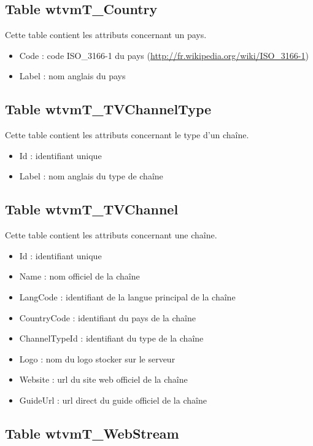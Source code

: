 \documentclass[10pt,a4paper]{article}
\begin{document}
\subsection{Table wtvmT\_Country}

Cette table contient les attributs concernant un pays.

\begin{itemize}
\item Code : code ISO\_3166-1 du pays (\url{http://fr.wikipedia.org/wiki/ISO\_3166-1})
\item Label : nom anglais du pays
\end{itemize}

\subsection{Table wtvmT\_TVChannelType}

Cette table contient les attributs concernant le type d'un chaîne.

\begin{itemize}
\item Id : identifiant unique
\item Label : nom anglais du type de chaîne
\end{itemize}

\subsection{Table wtvmT\_TVChannel}

Cette table contient les attributs concernant une chaîne.

\begin{itemize}
\item Id : identifiant unique
\item Name : nom officiel de la chaîne
\item LangCode : identifiant de la langue principal de la chaîne
\item CountryCode : identifiant du pays de la chaîne
\item ChannelTypeId : identifiant du type de la chaîne
\item Logo : nom du logo stocker sur le serveur
\item Website : url du site web officiel de la chaîne
\item GuideUrl : url direct du guide officiel de la chaîne
\end{itemize}

\subsection{Table wtvmT\_WebStream}
\end{document}
